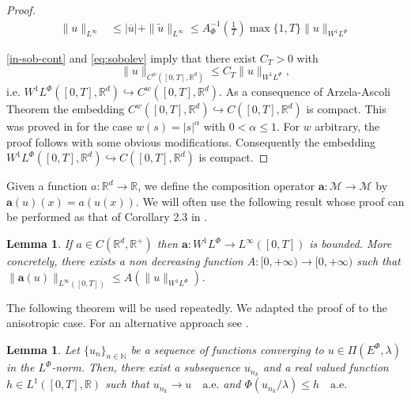 \documentclass[twoside]{article}
\newtheorem{lem}[thm]{Lemma}
\theoremstyle{remark}
\newcommand{\linf}{\|_{L^{\infty}}}
\newcommand{\lphi}{L^{\Phi}}
\newcommand{\ephi}{E^{\Phi}}
\newcommand{\wphi}{W^{1}\lphi}
\newcommand{\sobnor}{\|_{W^{1}\lphi}}
\renewcommand{\b}[1]{\boldsymbol{#1}}
\newcommand{\rr}{\mathbb{R}}
\renewcommand{\leq}{\leqslant}
\begin{document}
\begin{proof}
\[\begin{split}
 \|u\linf &\leq |\overline{u}|+\|\tilde{u}\linf\leq A_{\Phi}^{-1}\left(\frac{1}{T}\right)\max\{1,T\}\|u\sobnor
 \end{split}
 \]
 
\ref{in-sob-cont} and  \ref{eq:sobolev} imply that there exist $C_T>0$ with
\[\|u\|_{  C^w([0,T],\rr^d) }\leq   C_T\|u\sobnor,\]
i.e. $\wphi\left([0,T],\rr^d\right)\hookrightarrow C^w([0,T],\rr^d)$.
As a consequence of Arzela-Ascoli Theorem
 the embedding $C^w\left([0,T],\rr^d\right)\hookrightarrow C([0,T],\rr^d)$ is  compact. This was proved in  \cite[Prop. 5.13]{driver}   for the case $w(s)=|s|^{\alpha}$ with $0< \alpha\leq 1$. For  $w$  arbitrary, the proof follows with some obvious modifications. Consequently the embedding  $\wphi\left([0,T],\rr^d\right)\hookrightarrow C([0,T],\rr^d)$ is compact.
\end{proof}


Given a function $a:\mathbb{R}^d\to \mathbb{R}$, we define the composition operator $\b{a}:\mathcal{M}\to \mathcal{M}$ by $\b{a}(u)(x)= a(u(x))$.
We will often use the following result whose proof can be performed as that of  Corollary 2.3 in \cite{ABGMS2015}.
\begin{lem}\label{lem:cota-a}
\label{a_bound} If $a\in C(\mathbb{R}^d,\mathbb{R}^+)$ then $\b{a}:\wphi\to L^{\infty}([0,T])$ is bounded.
More concretely,  there exists a non decreasing function $A:[0,+\infty)\to[0,+\infty)$ such that
 $\|\b{a}(u)\|_{L^{\infty}([0,T])}\leq A(\|u\|_{\wphi})$.
\end{lem}

The following theorem will be used repeatedly. We adapted the proof of \cite[Lemma 2.5]{ABGMS2015} to the anisotropic case.    For an alternative approach see \cite{chamra2017anisotropic}.  


\begin{lem}\label{segundo lema}
Let  $\{{u}_n\}_{n\in \mathbb{N}}$ be a sequence of  functions  converging to  ${u}\in \Pi(\ephi,\lambda)$  in the $\lphi$-norm. Then, there exist a subsequence
${u}_{n_k}$ and a real valued function $h\in L^1([0,T],\rr)$ such that ${u}_{n_k}\rightarrow {u} \quad\text{a.e.}$ and $\Phi({u}_{n_k}/\lambda)\leq h\quad\text{a.e.}$
\end{lem}
\end{document}

